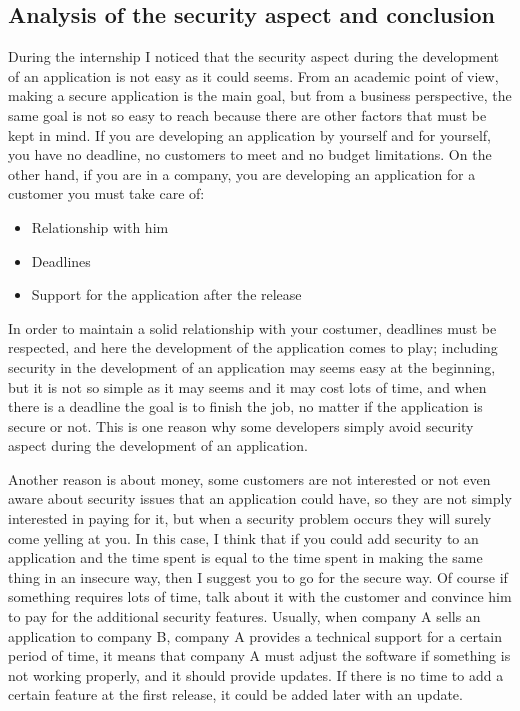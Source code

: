 \subsection{Analysis of the security aspect and conclusion}
During the internship I noticed that the security aspect during the development of an application is not easy as it could seems.\newline
From an academic point of view, making a secure application is the main goal, but from a business perspective, the same goal is not so easy to reach because there are other factors that must be kept in mind.\newline
If you are developing an application by yourself and for yourself, you have no deadline, no customers to meet and no budget limitations.\newline
On the other hand, if you are in a company, you are developing an application for a customer you must take care of:
\begin{itemize}
	\item Relationship with him
	\item Deadlines
	\item Support for the application after the release
\end{itemize}

In order to maintain a solid relationship with your costumer, deadlines must be respected, and here the development of the application comes to play; including security in the development of an application may seems easy at the beginning, but it is not so simple as it may seems and it may cost lots of time, and when there is a deadline the goal is to finish the job, no matter if the application is secure or not.\newline
This is one reason why some developers simply avoid security aspect during the development of an application.\newline

Another reason is about money, some customers are not interested or not even aware about security issues that an application could have, so they are not simply interested in paying for it, but when a security problem occurs they will surely come yelling at you.\newline
In this case, I think that if you could add security to an application and the time spent is equal to the time spent in making the same thing in an insecure way, then I suggest you to go for the secure way.\newline
Of course if something requires lots of time, talk about it with the customer and convince him to pay for the additional security features.\newline
Usually, when company A sells an application to company B, company A provides a technical support for a certain period of time, it means that company A must adjust the software if something is not working properly, and it should provide updates.
If there is no time to add a certain feature at the first release, it could be added later with an update.\newline

